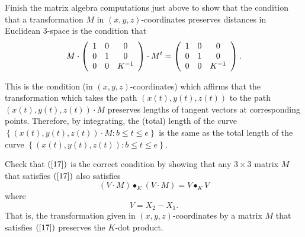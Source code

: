 \begin{exercise}
Finish the matrix algebra computations just above to show that the condition
that a transformation $M$ in $\left(  x,y,z\right)  $-coordinates preserves
distances in Euclidean $3$-space is the condition that%
\begin{equation}
M\cdot\left(
\begin{array}
[c]{ccc}%
1 & 0 & 0\\
0 & 1 & 0\\
0 & 0 & K^{-1}%
\end{array}
\right)  \cdot M^{t}=\left(
\begin{array}
[c]{ccc}%
1 & 0 & 0\\
0 & 1 & 0\\
0 & 0 & K^{-1}%
\end{array}
\right)  . \label{17}%
\end{equation}

\end{exercise}

This is the condition (in $\left(  x,y,z\right)  $-coordinates) which affirms
that the transformation which takes the path $\left(  x(t),y(t),z(t)\right)  $
to the path $\left(  x(t),y(t),z(t)\right)  \cdot M$ preserves lengths of
tangent vectors at corresponding points. Therefore, by integrating, the
(total) length of the curve $\left\{  \left(  x(t),y(t),z(t)\right)  \cdot
M:b\leq t\leq e\right\}  $ is the same as the total length of the curve
$\left\{  \left(  x(t),y(t),z(t)\right)  :b\leq t\leq e\right\}  $.

\begin{exercise}
Check that $\left(  \ref{17}\right)  $ is the correct condition by showing
that any $3\times3$ matrix $M$ that satisfies $\left(  \ref{17}\right)  $ also
satisfies%
\[
\left(   V  \cdot M\right)  \bullet_{K}\left(   V
\cdot M\right)  =V\bullet_{K}V
\]
where%
\[
V=X_{2}-X_{1}.
\]
That is, the transformation given in $\left(  x,y,z\right)  $-coordinates by a
matrix $M$ that satisfies $\left(  \ref{17}\right)  $ preserves the $K$-dot product.
\end{exercise}

